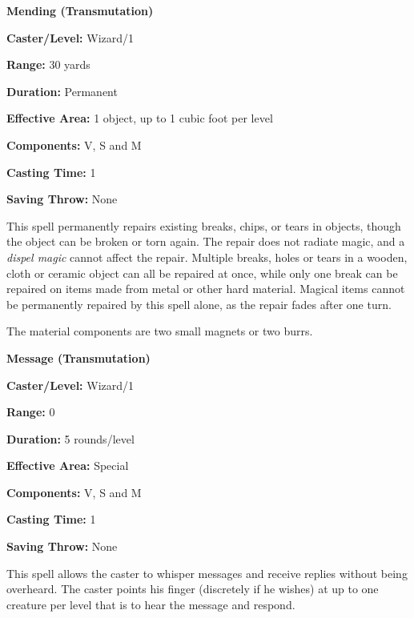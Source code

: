\begin{multicols}{2}
\noindent
\begin{minipage}{\columnwidth}

\noindent \textbf{Mending (Transmutation)}

\noindent \textbf{Caster/Level:} Wizard/1

\noindent \textbf{Range:} 30 yards

\noindent \textbf{Duration:} Permanent

\noindent \textbf{Effective Area:} 1 object, up to 1 cubic foot per level

\noindent \textbf{Components:} V, S and M

\noindent \textbf{Casting Time:} 1

\noindent \textbf{Saving Throw:} None

\end{minipage}

This spell permanently repairs existing breaks, chips, or tears in objects, though the object can be broken or torn again.  The repair does not radiate magic, and a \textit{dispel magic} cannot affect the repair.  Multiple breaks, holes or tears in a wooden, cloth or ceramic object can all be repaired at once, while only one break can be repaired on items made from metal or other hard material.  Magical items cannot be permanently repaired by this spell alone, as the repair fades after one turn.

The material components are two small magnets or two burrs.

\vspace{1em}

\noindent
\begin{minipage}{\columnwidth}

\noindent \textbf{Message (Transmutation)}

\noindent \textbf{Caster/Level:} Wizard/1

\noindent \textbf{Range:} 0

\noindent \textbf{Duration:} 5 rounds/level

\noindent \textbf{Effective Area:} Special

\noindent \textbf{Components:} V, S and M

\noindent \textbf{Casting Time:} 1

\noindent \textbf{Saving Throw:} None

\end{minipage}

This spell allows the caster to whisper messages and receive replies without being overheard.  The caster points his finger (discretely if he wishes) at up to one creature per level that is to hear the message and respond.  


\end{multicols}
